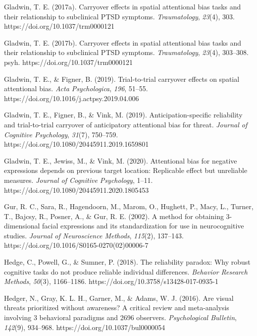 \documentclass{article}
\begin{document}
	Gladwin, T. E. (2017a). Carryover effects in spatial attentional bias tasks and their relationship to subclinical PTSD symptoms. \emph{Traumatology}, \emph{23}(4), 303. https://doi.org/10.1037/trm0000121



	Gladwin, T. E. (2017b). Carryover effects in spatial attentional bias tasks and their relationship to subclinical PTSD symptoms. \emph{Traumatology}, \emph{23}(4), 303--308. psyh. https://doi.org/10.1037/trm0000121



	Gladwin, T. E., \& Figner, B. (2019). Trial-to-trial carryover effects on spatial attentional bias. \emph{Acta Psychologica}, \emph{196}, 51--55. https://doi.org/10.1016/j.actpsy.2019.04.006



	Gladwin, T. E., Figner, B., \& Vink, M. (2019). Anticipation-specific reliability and trial-to-trial carryover of anticipatory attentional bias for threat. \emph{Journal of Cognitive Psychology}, \emph{31}(7), 750--759. https://doi.org/10.1080/20445911.2019.1659801



	Gladwin, T. E., Jewiss, M., \& Vink, M. (2020). Attentional bias for negative expressions depends on previous target location: Replicable effect but unreliable measures. \emph{Journal of Cognitive Psychology}, 1--11. https://doi.org/10.1080/20445911.2020.1805453



	Gur, R. C., Sara, R., Hagendoorn, M., Marom, O., Hughett, P., Macy, L., Turner, T., Bajcsy, R., Posner, A., \& Gur, R. E. (2002). A method for obtaining 3-dimensional facial expressions and its standardization for use in neurocognitive studies. \emph{Journal of Neuroscience Methods}, \emph{115}(2), 137--143. https://doi.org/10.1016/S0165-0270(02)00006-7



	Hedge, C., Powell, G., \& Sumner, P. (2018). The reliability paradox: Why robust cognitive tasks do not produce reliable individual differences. \emph{Behavior Research Methods}, \emph{50}(3), 1166--1186. https://doi.org/10.3758/s13428-017-0935-1



	Hedger, N., Gray, K. L. H., Garner, M., \& Adams, W. J. (2016). Are visual threats prioritized without awareness? A critical review and meta-analysis involving 3 behavioral paradigms and 2696 observers. \emph{Psychological Bulletin}, \emph{142}(9), 934--968. https://doi.org/10.1037/bul0000054
\end{document}
